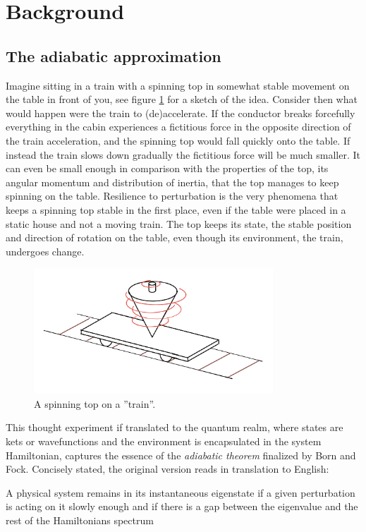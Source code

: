 \documentclass[main.tex]{subfiles}
\begin{document}
\section{Background}
\subsection{The adiabatic approximation}\label{sec:adiab}
Imagine sitting in a train with a spinning top in somewhat stable movement on the table in
front of you, see figure \ref{fig:toptrain} for a sketch of the idea. Consider then what would happen were the train to (de)accelerate. If the
conductor breaks forcefully everything in the cabin experiences a fictitious force in the
opposite direction of the train acceleration, and the spinning top would fall quickly onto
the table. If instead the train slows down gradually the fictitious force will be much
smaller. It can even be small enough in comparison with the properties of the top, its
angular momentum and distribution of inertia, that the top manages to keep spinning on
the table. Resilience to perturbation is the very phenomena that keeps a spinning top
stable in the first place, even if the table were placed in a static house and not a moving
train. The top keeps its state, the stable position and direction of rotation on the table,
even though its environment, the train, undergoes change. 

\begin{figure}[h]
        \centering
        \includegraphics[width=0.8\textwidth]{figures/top_train.png}
        \caption{A spinning top on a ''train''.}
        \label{fig:toptrain}
\end{figure}

This thought experiment if translated to the quantum realm, where states are kets or
wavefunctions and the environment is encapsulated in the system Hamiltonian, captures the
essence of the \textit{adiabatic theorem} finalized by Born and Fock\cite{adiab}. Concisely
stated, the original version reads in translation to English:
\begin{displayquote}
A physical system remains in its instantaneous eigenstate if a given perturbation is acting
on it slowly enough and if there is a gap between the eigenvalue and the rest of the
Hamiltonians spectrum
\end{displayquote}
\end{document}
